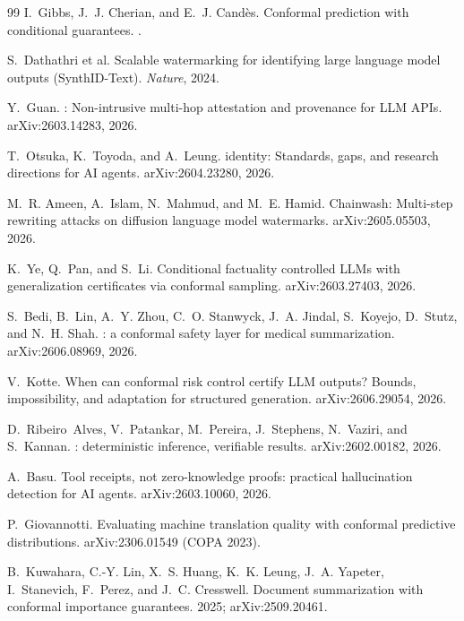 \documentclass[11pt]{article}
\theoremstyle{definition}
\begin{document}
\begin{thebibliography}{99}
I.~Gibbs, J.~J. Cherian, and E.~J. Cand\`es.
\newblock Conformal prediction with conditional guarantees.
.

S.~Dathathri et al.
\newblock Scalable watermarking for identifying large language model outputs
  ({SynthID-Text}).
\newblock \emph{Nature}, 2024.

Y.~Guan.
: Non-intrusive multi-hop attestation and provenance for {LLM}
  {APIs}.
\newblock arXiv:2603.14283, 2026.

T.~Otsuka, K.~Toyoda, and A.~Leung.
 identity: Standards, gaps, and research directions for {AI}
  agents.
\newblock arXiv:2604.23280, 2026.

M.~R. Ameen, A.~Islam, N.~Mahmud, and M.~E. Hamid.
\newblock Chainwash: Multi-step rewriting attacks on diffusion language model
  watermarks.
\newblock arXiv:2605.05503, 2026.

K.~Ye, Q.~Pan, and S.~Li.
\newblock Conditional factuality controlled {LLMs} with generalization
  certificates via conformal sampling.
\newblock arXiv:2603.27403, 2026.

S.~Bedi, B.~Lin, A.~Y. Zhou, C.~O. Stanwyck, J.~A. Jindal, S.~Koyejo,
D.~Stutz, and N.~H. Shah.
: a conformal safety layer for medical summarization.
\newblock arXiv:2606.08969, 2026.

V.~Kotte.
\newblock When can conformal risk control certify {LLM} outputs? {B}ounds,
impossibility, and adaptation for structured generation.
\newblock arXiv:2606.29054, 2026.

D.~Ribeiro~Alves, V.~Patankar, M.~Pereira, J.~Stephens, N.~Vaziri, and
S.~Kannan.
: deterministic inference, verifiable results.
\newblock arXiv:2602.00182, 2026.

A.~Basu.
\newblock Tool receipts, not zero-knowledge proofs: practical hallucination
  detection for {AI} agents.
\newblock arXiv:2603.10060, 2026.

P.~Giovannotti.
\newblock Evaluating machine translation quality with conformal predictive
  distributions.
\newblock arXiv:2306.01549 ({COPA} 2023).

B.~Kuwahara, C.-Y. Lin, X.~S. Huang, K.~K. Leung, J.~A. Yapeter,
I.~Stanevich, F.~Perez, and J.~C. Cresswell.
\newblock Document summarization with conformal importance guarantees.
 2025; arXiv:2509.20461.


\end{thebibliography}
\end{document}
